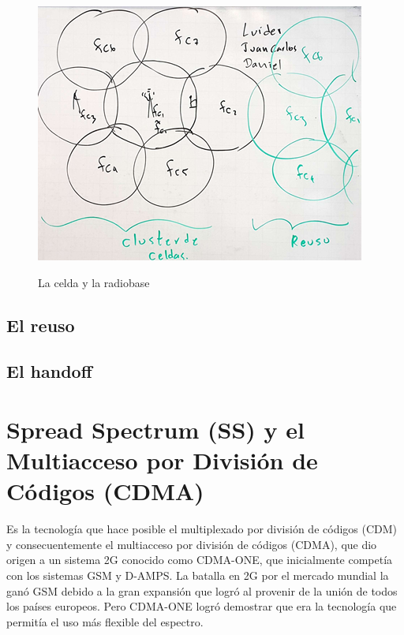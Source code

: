 \begin{figure}[h!]
	\captionsetup{justification = raggedright, singlelinecheck = false}
	\caption{La celda y la radiobase} 
	\centering
	\includegraphics[scale=1]{Imagenes/Cluster.png}
	\label{fig:Cluster}
\end{figure}

\subsection{El reuso}

\subsection{El handoff}

\section{Spread Spectrum (SS) y el Multiacceso por División de Códigos (CDMA)}

Es la tecnología que hace posible el multiplexado por división de códigos (CDM) y consecuentemente el multiacceso por división de códigos (CDMA), que dio origen a un sistema 2G conocido como CDMA-ONE, que inicialmente competía con los sistemas GSM y D-AMPS. La batalla en 2G por el mercado mundial la ganó GSM debido a la gran expansión que logró al provenir de la unión de todos los países europeos. Pero CDMA-ONE logró demostrar que era la tecnología que permitía el uso más flexible del espectro. \\

